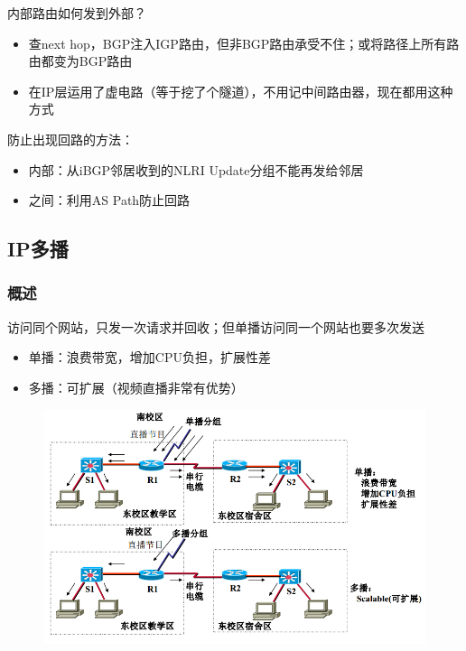 内部路由如何发到外部？
\begin{itemize}
\item 查next hop，BGP注入IGP路由，但非BGP路由承受不住；或将路径上所有路由都变为BGP路由
\item 在IP层运用了虚电路（等于挖了个隧道），不用记中间路由器，现在都用这种方式
\end{itemize}

\myhline
防止出现回路的方法：
\begin{itemize}
\item 内部：从iBGP邻居收到的NLRI Update分组不能再发给邻居
\item 之间：利用AS Path防止回路
\end{itemize}

\subsection{IP多播}
\subsubsection{概述}
访问同个网站，只发一次请求并回收；但单播访问同一个网站也要多次发送
\begin{itemize}
\item 单播：浪费带宽，增加CPU负担，扩展性差
\item 多播：可扩展（视频直播非常有优势）
\end{itemize}
\begin{figure}[H]
	\centering
	\includegraphics[width=0.8\linewidth]{fig/multicast.png}
\end{figure}


